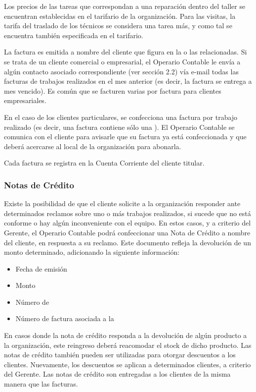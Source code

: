\documentclass[12pt]{extarticle}
\begin{document}
\begin{spacing}{1.2}
    Los precios de las tareas que correspondan a una reparación dentro del taller se encuentran establecidas en el tarifario de la organización. Para las visitas, la tarifa del traslado de los técnicos se considera una tarea más, y como tal se encuentra también especificada en el tarifario.

    La factura es emitida a nombre del cliente que figura en la o las \OTs{} relacionadas. Si se trata de un cliente comercial o empresarial, el Operario Contable le envía a algún contacto asociado correspondiente (ver sección 2.2) vía e-mail todas las facturas de trabajos realizados en el mes anterior (es decir, la factura se entrega a mes vencido). Es común que se facturen varias \OTs{} por factura para clientes empresariales.
    
    En el caso de los clientes particulares, se confecciona una factura por trabajo realizado (es decir, una factura contiene sólo una \OT{}). El Operario Contable se comunica con el cliente para avisarle que su factura ya está confeccionada y que deberá acercarse al local de la organización para abonarla.
   
    Cada factura se registra en la Cuenta Corriente del cliente titular. \\

    \subsubsection*{Notas de Crédito}
    Existe la posibilidad de que el cliente solicite a la organización responder ante determinados reclamos sobre uno o más trabajos realizados, si sucede que no está conforme o hay algún inconveniente con el equipo. En estos casos, y a criterio del Gerente, el Operario Contable podrá confeccionar una Nota de Crédito a nombre del cliente, en respuesta a su reclamo. Este documento refleja la devolución de un monto determinado, adicionando la siguiente información: \\
    \begin{itemize}
        \item Fecha de emisión
        \item Monto
        \item Número de \OT{}
        \item Número de factura asociada a la \OT{}
    \end{itemize}

	En casos donde la nota de crédito responda a la devolución de algún producto a la organización, este reingreso deberá reacomodar el stock de dicho producto.
	Las notas de crédito también pueden ser utilizadas para otorgar descuentos a los clientes. Nuevamente, los descuentos se aplican a determinados clientes, a criterio del Gerente.
	Las notas de crédito son entregadas a los clientes de la misma manera que las facturas.\\
	

\end{spacing}
\end{document}
